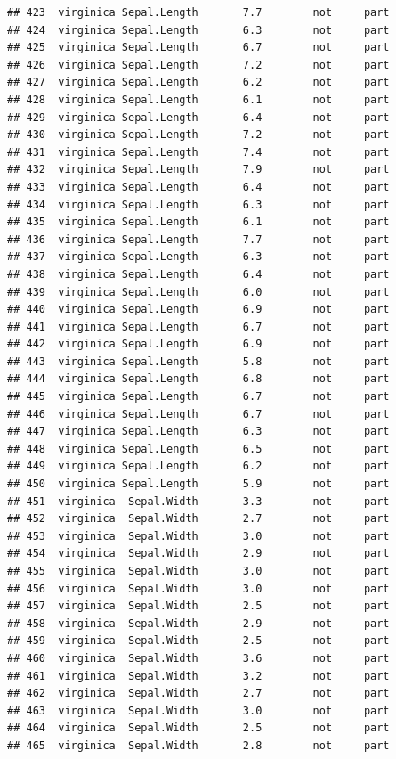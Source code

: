 \documentclass[krantz2]{krantz}\usepackage{knitr}%
\begin{document}
\begin{knitrout}
\begin{kframe}
\begin{verbatim}
## 423  virginica Sepal.Length       7.7        not     part
## 424  virginica Sepal.Length       6.3        not     part
## 425  virginica Sepal.Length       6.7        not     part
## 426  virginica Sepal.Length       7.2        not     part
## 427  virginica Sepal.Length       6.2        not     part
## 428  virginica Sepal.Length       6.1        not     part
## 429  virginica Sepal.Length       6.4        not     part
## 430  virginica Sepal.Length       7.2        not     part
## 431  virginica Sepal.Length       7.4        not     part
## 432  virginica Sepal.Length       7.9        not     part
## 433  virginica Sepal.Length       6.4        not     part
## 434  virginica Sepal.Length       6.3        not     part
## 435  virginica Sepal.Length       6.1        not     part
## 436  virginica Sepal.Length       7.7        not     part
## 437  virginica Sepal.Length       6.3        not     part
## 438  virginica Sepal.Length       6.4        not     part
## 439  virginica Sepal.Length       6.0        not     part
## 440  virginica Sepal.Length       6.9        not     part
## 441  virginica Sepal.Length       6.7        not     part
## 442  virginica Sepal.Length       6.9        not     part
## 443  virginica Sepal.Length       5.8        not     part
## 444  virginica Sepal.Length       6.8        not     part
## 445  virginica Sepal.Length       6.7        not     part
## 446  virginica Sepal.Length       6.7        not     part
## 447  virginica Sepal.Length       6.3        not     part
## 448  virginica Sepal.Length       6.5        not     part
## 449  virginica Sepal.Length       6.2        not     part
## 450  virginica Sepal.Length       5.9        not     part
## 451  virginica  Sepal.Width       3.3        not     part
## 452  virginica  Sepal.Width       2.7        not     part
## 453  virginica  Sepal.Width       3.0        not     part
## 454  virginica  Sepal.Width       2.9        not     part
## 455  virginica  Sepal.Width       3.0        not     part
## 456  virginica  Sepal.Width       3.0        not     part
## 457  virginica  Sepal.Width       2.5        not     part
## 458  virginica  Sepal.Width       2.9        not     part
## 459  virginica  Sepal.Width       2.5        not     part
## 460  virginica  Sepal.Width       3.6        not     part
## 461  virginica  Sepal.Width       3.2        not     part
## 462  virginica  Sepal.Width       2.7        not     part
## 463  virginica  Sepal.Width       3.0        not     part
## 464  virginica  Sepal.Width       2.5        not     part
## 465  virginica  Sepal.Width       2.8        not     part

\end{verbatim}
\end{kframe}
\end{knitrout}
\end{document}
